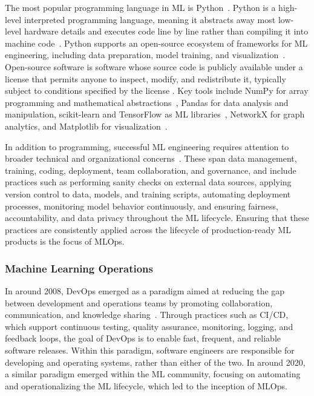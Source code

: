 \documentclass[
english,                 %
bibtex,                  %
includeExtraAbstracts, %
]{kththesis}
\numberwithin{listing}{chapter}
\begin{document}
The most popular programming language in \gls{ML} is Python~\cite{raschka_machine_2020}. Python is a high-level interpreted programming language, meaning it abstracts away most low-level hardware details and executes code line by line rather than compiling it into machine code~\cite{van_rossum_python_2003}. Python supports an open-source ecosystem of frameworks for \gls{ML} engineering, including data preparation, model training, and visualization~\cite{raschka_machine_2020}. Open-source software is software whose source code is publicly available under a license that permits anyone to inspect, modify, and redistribute it, typically subject to conditions specified by the license \cite{raymond_cathedral_2001}. Key tools include \gls{NumPy} for array programming and mathematical abstractions~\cite{harris_array_2020}, Pandas for data analysis and manipulation, \gls{scikit}-learn and TensorFlow as \gls{ML} libraries~\cite{abadi_tensorflow_2016}, NetworkX for graph analytics, and Matplotlib for visualization~\cite{barrett_matplotlib_2005}.

In addition to programming, successful \gls{ML} engineering requires attention to broader technical and organizational concerns~\cite{serban_adoption_2020}. These span data management, training, coding, deployment, team collaboration, and governance, and include practices such as performing sanity checks on external data sources, applying version control to data, models, and training scripts, automating deployment processes, monitoring model behavior continuously, and ensuring fairness, accountability, and data privacy throughout the \gls{ML} lifecycle. Ensuring that these practices are consistently applied across the lifecycle of production-ready \gls{ML} products is the focus of \gls{MLOps}.

\subsubsection{Machine Learning Operations}

In around 2008, \gls{DevOps} emerged as a paradigm aimed at reducing the gap between development and operations teams by promoting collaboration, communication, and knowledge sharing~\cite{kreuzberger_machine_2023}. Through practices such as \gls{CI/CD}, which support continuous testing, quality assurance, monitoring, logging, and feedback loops, the goal of \gls{DevOps} is to enable fast, frequent, and reliable software releases. Within this paradigm, software engineers are responsible for developing and operating systems, rather than either of the two. In around 2020, a similar paradigm emerged within the \gls{ML} community, focusing on automating and operationalizing the \gls{ML} lifecycle, which led to the inception of \gls{MLOps}.
\end{document}
